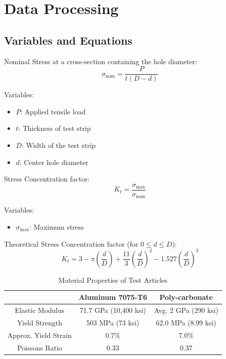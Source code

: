 \documentclass{article}
\begin{document}
\section{Data Processing}
\subsection{Variables and Equations}  

Nominal Stress at a cross-section containing the hole diameter:
\begin{equation}
    \sigma_{\text{nom}} = \dfrac{P}{t(D-d)}
\end{equation}

Variables:
\begin{itemize}
    \item \(P\): Applied tensile load
    \item \(t\): Thickness of test strip
    \item \(D\): Width of the test strip
    \item \(d\): Center hole diameter
\end{itemize}
\vspace{5mm}

Stress Concentration factor:
\begin{equation}
    K_{t} = \dfrac{\sigma_{\text{max}}}{\sigma_{\text{nom}}}
\end{equation}

Variables:
\begin{itemize}
    \item \(\sigma_{\text{max}}\): Maximum stress
\end{itemize}
\vspace{5mm}

Theoretical Stress Concentration factor (for $0 \leq d \leq D$):
\begin{equation}
    K_{t} = 3 - \pi\left(\dfrac{d}{D}\right) + \frac{11}{3}\left(\dfrac{d}{D}\right)^{2} - 1.527\left(\dfrac{d}{D}\right)^{3} 
\end{equation}
\vspace{5mm}

\begin{table}[H]
    \centering
    \begin{tabular}{c c c}
        \hline
        \hline 
        
         & Aluminum 7075-T6 & Poly-carbonate  \\  
         
         \hline
         
        Elastic Modulus & 71.7 GPa (10,400 ksi) & Avg. 2 GPa (290 ksi) \\[2pt]
        Yield Strength & 503 MPa (73 ksi) & 62.0 MPa (8.99 ksi) \\[2pt]
        Approx. Yield Strain & 0.7\% & 7.0\% \\[2pt]
        Poissons Ratio & 0.33 & 0.37 \\[2pt]
        
        \hline
        \hline
    \end{tabular}
    \caption{Material Properties of Test Articles}
    \label{tab:materialproperties}
\end{table}
\end{document}
